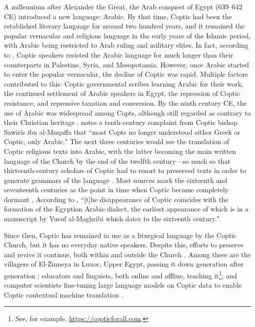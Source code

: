 \documentclass[12pt,a4paper]{article}
\newcounter{example}
\begin{document}
A millennium after Alexander the Great, the Arab conquest of Egypt (639--642 CE) introduced a new language: Arabic. By that time, Coptic had been the established literary language for around two hundred years, and it remained the popular vernacular and religious language in the early years of the Islamic period, with Arabic being restricted to Arab ruling and military elites. In fact, according to \textcite{sidarus_coptic_2013, rubenson_transition_1996}, Coptic speakers resisted the Arabic language for much longer than their counterparts in Palestine, Syria, and Mesopotamia. However, once Arabic started to enter the popular vernacular, the decline of Coptic was rapid. Multiple factors contributed to this: Coptic governmental scribes learning Arabic for their work, the continued settlement of Arabic speakers in Egypt, the repression of Coptic resistance, and repressive taxation and conversion. By the ninth century CE, the use of Arabic was widespread among Copts, although still regarded as contrary to their Christian heritage \parencite{rubenson_transition_1996, gabra_z_2009, takla_coptic_2013}. \textcite[7]{watson_phonology_2002} notes a tenth-century complaint from Coptic bishop Sawīris ibn al-Muqaffa that ``most Copts no longer understood either Greek or Coptic, only Arabic." The next three centuries would see the translation of Coptic religious texts into Arabic, with the latter becoming the main written language of the Church by the end of the twelfth century---so much so that thirteenth-century scholars of Coptic had to resort to preserved texts in order to generate grammars of the language \parencite{rubenson_transition_1996, gabra_z_2009, takla_coptic_2013}. Most sources mark the sixteenth and seventeenth centuries as the point in time when Coptic became completely dormant \parencite{watson_phonology_2002, birkeland_growth_1952}. According to \textcite[v]{abdelrahman_linguistic_2023}, ``[t]he disappearance of Coptic coincides with the formation of the Egyptian Arabic dialect, the earliest appearance of which is in a manuscript by Yusuf al-Maghribi which dates to the sixteenth century."

Since then, Coptic has remained in use as a liturgical language by the Coptic Church, but it has no everyday native speakers. Despite this, efforts to preserve and revive it continue, both within and outside the Church \parencite{takla_coptic_2013}. Among these are the villagers of El-Zinneya in Luxor, Upper Egypt,  passing it down generation after generation \parencite{abdallah_textarabic_2019}; educators and linguists, both online and offline, teaching it\footnote{See, for example, \url{https://copticforall.com}.}; and computer scientists fine-tuning large language models on Coptic data to enable Coptic contextual machine translation \parencite{enis_ancient_2024}.
\end{document}
